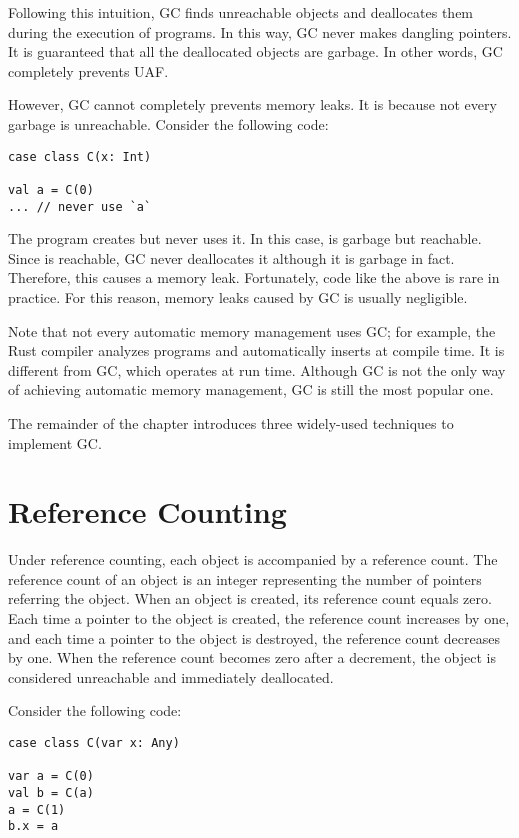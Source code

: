 Following this intuition, GC finds unreachable objects and deallocates them
during the execution of programs. In this way, GC never makes dangling pointers.
It is guaranteed that all the deallocated objects are garbage. In other words,
GC completely prevents UAF.

However, GC cannot completely prevents memory leaks. It is because not every
garbage is unreachable. Consider the following code:

\begin{verbatim}
case class C(x: Int)

val a = C(0)
... // never use `a`
\end{verbatim}

The program creates  but never uses it. In this case,  is
garbage but reachable. Since  is reachable, GC never deallocates it
although it is garbage in fact. Therefore, this causes a memory leak.
Fortunately, code like the above is rare in practice. For this reason, memory
leaks caused by GC is usually negligible.

Note that not every automatic memory management uses GC; for example, the Rust
compiler analyzes programs and automatically inserts  at compile
time. It is different from GC, which operates at run time. Although GC is not
the only way of achieving automatic memory management, GC is still the most
popular one.

The remainder of the chapter introduces three widely-used techniques to
implement GC.

\section{Reference Counting}

Under reference counting, each object is accompanied by a reference count. The
reference count of an object is an integer representing the number of pointers
referring the object. When an object is created, its reference count equals
zero. Each time a pointer to the object is created, the reference count
increases by one, and each time a pointer to the object is destroyed, the
reference count decreases by one. When the reference count becomes zero after a
decrement, the object is considered unreachable and immediately deallocated.

Consider the following code:

\begin{verbatim}
case class C(var x: Any)

var a = C(0)
val b = C(a)
a = C(1)
b.x = a
\end{verbatim}

